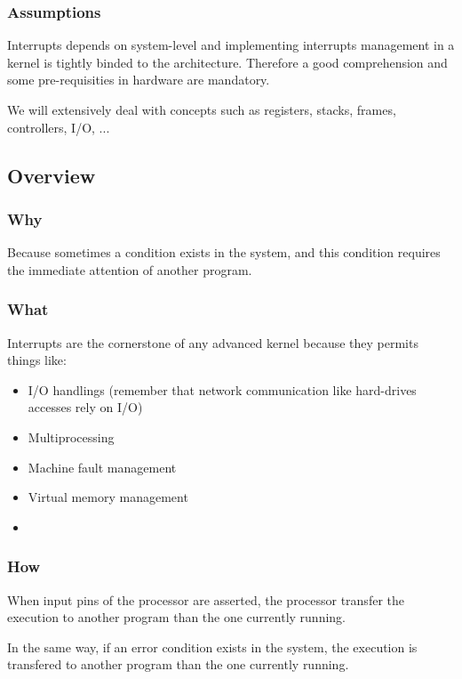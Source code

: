 
\begin{frame}
  \frametitle{Assumptions}

  Interrupts  depends on system-level and implementing interrupts management in a kernel is tightly binded to the architecture. Therefore a good comprehension and some pre-requisities in hardware are mandatory.

  \-

We will extensively deal with concepts such as registers, stacks, frames, controllers, I/O, ...

\end{frame}

%
%


\subsection{Overview}


\begin{frame}
  \frametitle{Why}

Because sometimes a condition exists in the system, and this condition requires the immediate attention of another program.

\end{frame}


\begin{frame}
  \frametitle{What}

  Interrupts are the cornerstone of any advanced kernel because they permits things like:

  \begin{itemize}
    \item
      I/O handlings (remember that network communication like hard-drives accesses rely on I/O)
    \item
      Multiprocessing
    \item
      Machine fault management
    \item
      Virtual memory management
    \item
      \etc{}
  \end{itemize}
\end{frame}

\begin{frame}
  \frametitle{How}

When input pins of the processor are asserted, the processor transfer the execution to another program than the one currently running.

  \-

In the same way, if an error condition exists in the system, the execution is transfered to another program than the one currently running.

\end{frame}

